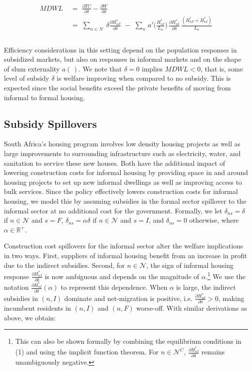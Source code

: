 \documentclass[12pt]{article}
\begin{document}
\begin{equation*}
\begin{aligned}
MDWL \,\,&=\,\, \frac{\partial TC}{\partial \delta} - \frac{\partial W}{\partial \delta} \\[.6em]
     \,\,&=\,\, \sum_{n\in\mathcal{N}} \,\delta\frac{\partial H^*_{nF}}{\partial \delta} \,\,-\,\, \sum_{n} \, a'\Big(\frac{H^*_{nI}}{L_n}\Big)\,\frac{\partial H^*_{nI}}{\partial \delta}\,\frac{(H^*_{nF}+H^*_{nI})}{L_n} \\
\end{aligned}
\end{equation*} \\[-1.99em]

 Efficiency considerations in this setting depend on the population responses in subsidized markets, but also on responses in informal markets and on the shape of slum externality $a(\,)$. We note that $\delta=0$ implies $MDWL<0$, that is, some level of subsidy $\delta$ is welfare improving when compared to no subsidy. This is expected since the social benefits exceed the private benefits of moving from informal to formal housing. 

\subsection*{Subsidy Spillovers}

South Africa's housing program involves low density housing projects as well as large improvements to surrounding infrastructure such as electricity, water, and sanitation to service these new houses.  Both have the additional impact of lowering construction costs for informal housing by providing space in and around housing projects to set up new informal dwellings as well as improving access to bulk services.  Since the policy effectively lowers construction costs for informal housing, we model this by assuming subsidies in the formal sector spillover to the informal sector at no additional cost for the government. Formally, we let $\delta_{ns} = \delta$ if $n\in\mathcal{N}$ and $s=F$, $\delta_{ns} = \alpha\delta$ if $n\in\mathcal{N}$ and $s=I$, and $\delta_{ns} = 0$ otherwise, where $\alpha\in\mathbb{R}^+$. 

Construction cost spillovers for the informal sector alter the welfare implications in two ways. First, suppliers of informal housing benefit from an increase in profit due to the indirect subsidies. Second, for $n\in\mathcal{N}$, the sign of informal housing response $\frac{\partial H^*_{nI}}{\partial\delta}$ is now ambiguous and depends on the magnitude of $\alpha$.\footnote{ This can also be shown formally by combining the equilibrium conditions in (1) and using the implicit function theorem. For $n\in\mathcal{N}^C$, $\frac{\partial H^*_{nI}}{\partial\delta}$ remains unambiguously negative.} We use the notation $\frac{\partial H^*_{nI}}{\partial\delta}(\alpha)$ to represent this dependence. When $\alpha$ is large, the indirect subsidies in $(n,I)$ dominate and net-migration is positive, i.e. $\frac{\partial H^*_{nI}}{\partial\delta}>0$, making incumbent residents in $(n,I)$ and $(n,F)$ worse-off. With similar derivations as above, we obtain:
\end{document}
